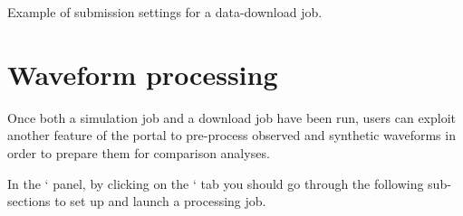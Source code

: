 \documentclass[english]{book}
\begin{document}

 Example of submission settings for a data-download
job.


\section{Waveform processing}
\label{\detokenize{Section7:waveform-processing}}
Once both a simulation job and a download job have been run, users can
exploit another feature of the portal to pre-process observed and
synthetic waveforms in order to prepare them for comparison analyses.

In the ‘ panel, by clicking on the
‘ tab you should go through the following sub-sections to
set up and launch a processing job.
\end{document}
